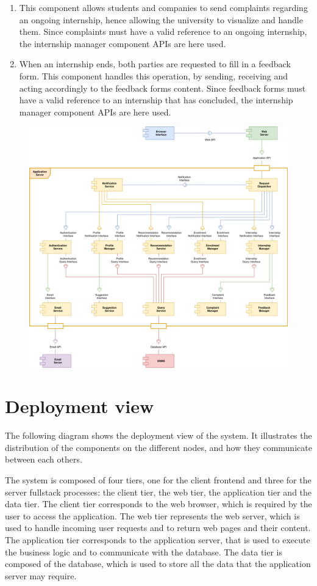 \begin{enumerate}[label=\textbf{C\arabic* -}]
\item {}
This component allows students and companies to send complaints regarding an ongoing internship, hence allowing the university to visualize and handle them.
Since complaints must have a valid reference to an ongoing internship, the internship manager component APIs are here used.

\item {}
When an internship ends, both parties are requested to fill in a feedback form.
This component handles this operation, by sending, receiving and acting accordingly to the feedback forms content.
Since feedback forms must have a valid reference to an internship that has concluded, the internship manager component APIs are here used.

\end{enumerate}

\begin{figure}[H]
    \centering
    \includegraphics[width=0.8\linewidth]{../../assets/components-diagrams/components-diagram.png}
\end{figure}

\section{Deployment view}

The following diagram shows the deployment view of the system.
It illustrates the distribution of the components on the different nodes, and how they communicate between each others.

The system is composed of four tiers, one for the client frontend and three for the server fullstack processes: the client tier, the web tier, the application tier and the data tier.
The client tier corresponds to the web browser, which is required by the user to access the application.
The web tier represents the web server, which is used to handle incoming user requests and to return web pages and their content.
The application tier corresponds to the application server, that is used to execute the business logic and to communicate with the database.
The data tier is composed of the database, which is used to store all the data that the application server may require.

